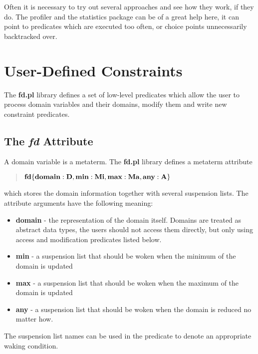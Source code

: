 Often it is necessary to try out several approaches
and see how they work, if they do.
The profiler and the statistics package can be of a great help here,
it can point to predicates which are executed too often, or
choice points unnecessarily backtracked over.

\section{User-Defined Constraints}
The {\bf fd.pl} library defines a set of low-level predicates
which
allow the user to process domain variables
and their domains, modify them and write new constraint
predicates.

\subsection{The {\it fd} Attribute}
A domain variable is a metaterm.
The {\bf fd.pl} library defines a metaterm attribute
\begin{quote}
${\bf fd\{domain:D, min:Mi, max:Ma, any:A\}}$
\end{quote}
\label{fd:attribute}
which stores the domain information together with several suspension lists.
The attribute arguments have the following meaning:
\begin{itemize}
\item {\bf domain} - the representation of the domain itself.
Domains are treated as abstract data types, the users should not
access them directly, but only using access and modification
predicates listed below.

\item {\bf min} - a suspension list that should be woken when the minimum
        of the domain is updated

\item {\bf max} - a suspension list that should be woken when the maximum
        of the domain is updated

\item {\bf any} - a suspension list that should be woken when the domain
        is reduced no matter how.
\end{itemize}
The suspension list names can be used in the predicate 
to denote an appropriate waking condition.


